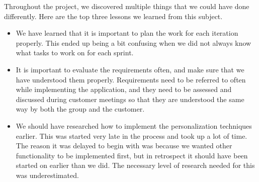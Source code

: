 Throughout the project, we discovered multiple things that we could have done differently. Here are the top three lessons we learned from this subject.

\begin{itemize}
\item We have learned that it is important to plan the work for each iteration properly. This ended up being a bit confusing when we did not always know what tasks to work on for each sprint.

\item It is important to evaluate the requirements often, and make sure that we have understood them properly. Requirements need to be referred to often while implementing the application, and they need to be assessed and discussed during customer meetings so that they are understood the same way by both the group and the customer.

\item We should have researched how to implement the personalization techniques earlier. This was started very late in the process and took up a lot of time. The reason it was delayed to begin with was because we wanted other functionality to be implemented first, but in retrospect it should have been started on earlier than we did. The necessary level of research needed for this was underestimated.
\end{itemize}

\cleardoublepage